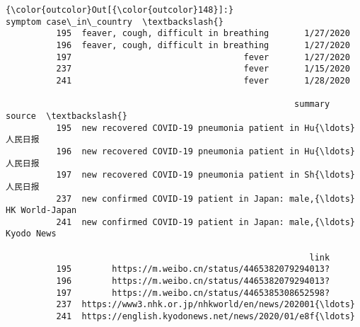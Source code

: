 \documentclass[11pt]{article}
\begin{document}
\begin{Verbatim}[commandchars=\\\{\}]
{\color{outcolor}Out[{\color{outcolor}148}]:}                                    symptom case\_in\_country  \textbackslash{}
          195  feaver, cough, difficult in breathing       1/27/2020   
          196  feaver, cough, difficult in breathing       1/27/2020   
          197                                  fever       1/27/2020   
          237                                  fever       1/15/2020   
          241                                  fever       1/28/2020   
          
                                                         summary          source  \textbackslash{}
          195  new recovered COVID-19 pneumonia patient in Hu{\ldots}            人民日报   
          196  new recovered COVID-19 pneumonia patient in Hu{\ldots}            人民日报   
          197  new recovered COVID-19 pneumonia patient in Sh{\ldots}            人民日报   
          237  new confirmed COVID-19 patient in Japan: male,{\ldots}  HK World-Japan   
          241  new confirmed COVID-19 patient in Japan: male,{\ldots}      Kyodo News   
          
                                                            link  
          195        https://m.weibo.cn/status/4465382079294013?  
          196        https://m.weibo.cn/status/4465382079294013?  
          197        https://m.weibo.cn/status/4465385308652598?  
          237  https://www3.nhk.or.jp/nhkworld/en/news/202001{\ldots}  
          241  https://english.kyodonews.net/news/2020/01/e8f{\ldots}  
\end{Verbatim}
            

    
    
    
    
\end{document}
